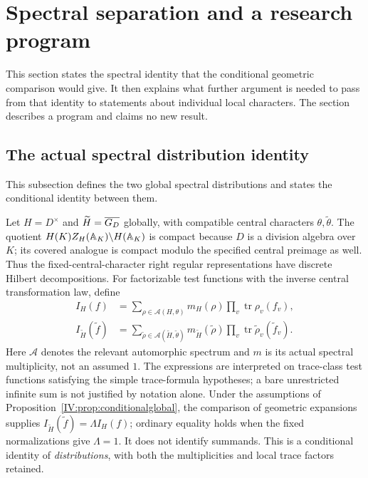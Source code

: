 \section{Spectral separation and a research program}\label{IV:sec:spectral}
This section states the spectral identity that the conditional geometric comparison would give. It then explains what further argument is needed to pass from that identity to statements about individual local characters. The section describes a program and claims no new result.

\subsection{The actual spectral distribution identity}
This subsection defines the two global spectral distributions and states the conditional identity between them.

Let $H=D^\times$ and $\widetilde H=\overline{G_D}$ globally, with
compatible central characters $\theta,\widetilde\theta$.
The quotient $H(K)Z_H(\mathbb A_K)\backslash H(\mathbb A_K)$ is compact
because $D$ is a division algebra over $K$; its covered analogue
is compact modulo the specified central preimage as well.
Thus the fixed-central-character right regular representations
have discrete Hilbert decompositions.  For factorizable test
functions with the inverse central transformation law, define
\begin{align}
 I_H(f)&=\sum_{\rho\in\mathcal A(H,\theta)}
       m_H(\rho)\prod_v\operatorname{tr}\rho_v(f_v),\\
 I_{\widetilde H}(\widetilde f)
     &=\sum_{\widetilde\rho\in\mathcal A(\widetilde H,\widetilde\theta)}
       m_{\widetilde H}(\widetilde\rho)
       \prod_v\operatorname{tr}\widetilde\rho_v(\widetilde f_v).
       \label{IV:eq:spectralglobal}
\end{align}
Here $\mathcal A$ denotes the relevant automorphic spectrum
and $m$ is its actual spectral multiplicity, not an assumed $1$.
The expressions are interpreted on trace-class test functions
satisfying the simple trace-formula hypotheses; a bare
unrestricted infinite sum is not justified by notation alone.
Under the assumptions of Proposition~\ref{IV:prop:conditionalglobal},
the comparison of geometric expansions supplies
$I_{\widetilde H}(\widetilde f)=\Lambda I_H(f)$;
ordinary equality holds when the fixed normalizations give
$\Lambda=1$.  It does not
identify summands.  This is a conditional identity of
\emph{distributions}, with both the multiplicities and local
trace factors retained.

